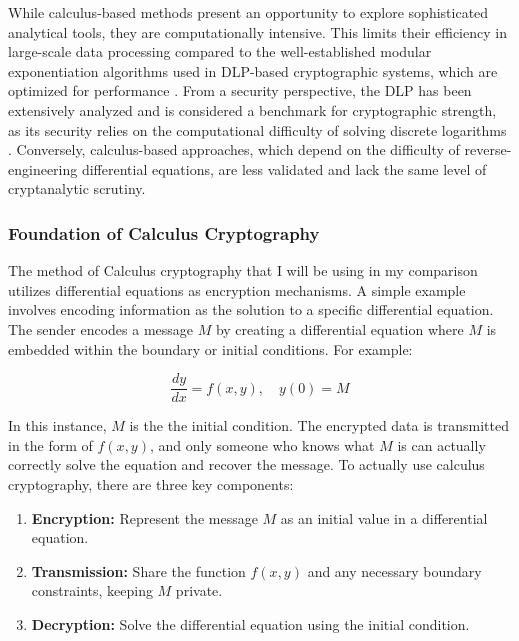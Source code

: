\documentclass[12pt]{article}
\begin{document}
While calculus-based methods present an opportunity to explore sophisticated analytical tools, they are computationally intensive. This limits their efficiency in large-scale data processing compared to the well-established modular exponentiation algorithms used in DLP-based cryptographic systems, which are optimized for performance \cite{Koblitz1994}. From a security perspective, the DLP has been extensively analyzed and is considered a benchmark for cryptographic strength, as its security relies on the computational difficulty of solving discrete logarithms \cite{Trappe2006}. Conversely, calculus-based approaches, which depend on the difficulty of reverse-engineering differential equations, are less validated and lack the same level of cryptanalytic scrutiny.

\subsubsection*{Foundation of Calculus Cryptography}

The method of Calculus cryptography that I will be using in my comparison utilizes  differential equations as encryption mechanisms. A simple example involves encoding information as the solution to a specific differential equation. The sender encodes a message \( M \) by creating a differential equation where \( M \) is embedded within the boundary or initial conditions. For example:

\[
\frac{dy}{dx} = f(x, y), \quad y(0) = M
\]

In this instance, \( M \) is the the initial condition. The encrypted data is transmitted in the form of \( f(x, y) \), and only someone who knows what \( M \) is can actually correctly solve the equation and recover the message. To actually use calculus cryptography, there are three key components:

\begin{enumerate}
    \item \textbf{Encryption:} Represent the message \( M \) as an initial value in a differential equation.
    \item \textbf{Transmission:} Share the function \( f(x, y) \) and any necessary boundary constraints, keeping \( M \) private.
    \item \textbf{Decryption:} Solve the differential equation using the initial condition.
\end{enumerate}
\end{document}
